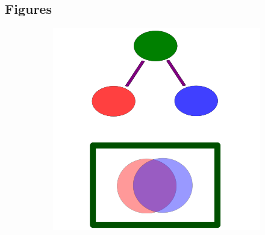 \documentclass{bmcart}
\begin{document}
\begin{backmatter}


\section*{Figures}

\begin{figure}[h!]
  \begin{subfigure}[b]{0.3\textwidth}
    \includegraphics[width=\textwidth]{figures/RedundancyTrimmingOntogeny.png}
   	 	\caption{}
    \label{fig:simdiagram}
  \end{subfigure}
  \begin{subfigure}[b]{0.3\textwidth}

\end{subfigure}
\end{figure}
\end{backmatter}
\end{document}
